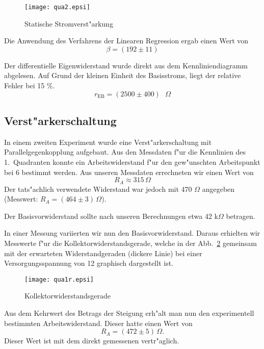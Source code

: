 \documentclass[a4paper,10pt]{article}
\begin{document}
\begin{figure}[htb]
	\centering
	\texttt{[image: qua2.epsi]}
	\caption{Statische Stromverst"arkung}
	\label{qua2}
\end{figure}

Die Anwendung des Verfahrens der Linearen Regression ergab einen Wert von
\begin{equation}
\beta = (192 \pm 11)
\end{equation}

Der differentielle Eigenwiderstand wurde direkt aus dem Kennliniendiagramm abgelesen. Auf Grund der kleinen Einheit des Basisstroms, liegt der relative Fehler bei 15 \%.
\begin{equation}
r_\text{EB} = (2500 \pm 400) \text{ } \Omega
\end{equation}

\subsection{Verst"arkerschaltung}
In einem zweiten Experiment wurde eine Verst"arkerschaltung mit Parallelgegenkopplung aufgebaut. Aus den Messdaten f"ur die Kennlinien des 1.~Quadranten konnte ein Arbeitswiderstand f"ur den gew"unschten Arbeitspunkt bei \unit{6}{\volt} bestimmt werden. Aus unseren Messdaten errechneten wir einen Wert von
\begin{equation}
R_A \approx 315 \, \Omega
\end{equation}
Der tats"achlich verwendete Widerstand war jedoch mit 470 $\Omega$ angegeben (Messwert: $R_A = (464 \pm 3) \, \Omega$).

Der Basisvorwiderstand sollte nach unseren Berechnungen etwa 42 k$\Omega$ betragen.

In einer Messung variierten wir nun den Basisvorwiderstand. Daraus erhielten wir Messwerte f"ur die Kollektorwiderstandsgerade, welche in der Abb.~\ref{wid} gemeinsam mit der erwarteten Widerstandgeraden (dickere Linie) bei einer Versorgungsspannung von \unit{12}{\volt} graphisch dargestellt ist.

\begin{figure}[htb]
	\centering
	\texttt{[image: qua1r.epsi]}
	\caption{Kollektorwiderstandsgerade}
	\label{wid}
\end{figure}

Aus dem Kehrwert des Betrags der Steigung erh"alt man nun den experimentell bestimmten Arbeitswiderstand. Dieser hatte einen Wert von
\begin{equation}
R_A = (472 \pm 5) \, \Omega.
\end{equation}
Dieser Wert ist mit dem direkt gemessenen vertr"aglich.
\end{document}

